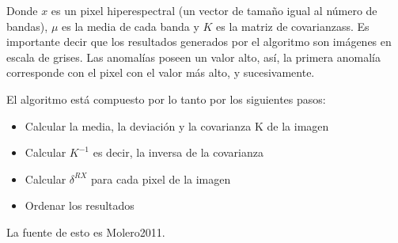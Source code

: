 Donde $x$ es un pixel hiperespectral (un vector de tamaño igual al número de bandas), $\mu$ es la media de cada banda y $K$ es la matriz de covarianzass. Es importante decir que los resultados generados por el algoritmo son imágenes en escala de grises. Las anomalías poseen un valor alto, así, la primera anomalía corresponde con el pixel con el valor más alto, y sucesivamente.

El algoritmo está compuesto por lo tanto por los siguientes pasos:
\begin{itemize}
\item Calcular la media, la deviación y la covarianza K de la imagen
\item Calcular $K^{-1}$ es decir, la inversa de la covarianza
\item Calcular $\delta ^{RX}$ para cada pixel de la imagen
\item Ordenar los resultados
\end{itemize}

La fuente de esto es Molero2011.
